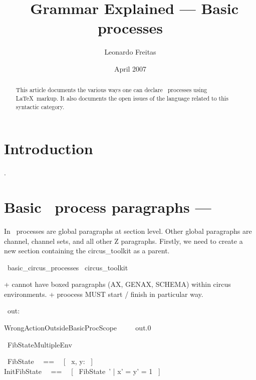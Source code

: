 \documentclass{article}
\begin{document}
\title{\Circus\ Grammar Explained --- Basic processes}
\author{Leonardo Freitas}
\date{April 2007}

\maketitle

\begin{abstract}
    \noindent This article documents the various ways one can declare \Circus\ processes using \LaTeX\ markup.
    It also documents the open issues of the language related to this syntactic category.
\end{abstract}

\section{Introduction}
.
\section{Basic \Circus\ process paragraphs --- }

In \Circus\ processes are global paragraphs at section level. Other
global paragraphs are channel, channel sets, and all other Z
paragraphs. Firstly, we need to create a new section containing the
\textsf{circus\_toolkit} as a parent.

\begin{zsection}
  \SECTION\ basic\_circus\_processes \parents\ circus\_toolkit
\end{zsection}

+ cannot have boxed paragraphs (AX, GENAX, SCHEMA) within circus environments.
+ proocess MUST start / finish in particular way.

\begin{circus}
    \circchannel\ out: \nat
\end{circus}

\begin{circusaction}
    WrongActionOutsideBasicProcScope ~~\circdef~~ out.0 \then \Skip
\end{circusaction}

\begin{circus}
    \circprocess\ FibStateMultipleEnv ~~\circdef~~ \circbegin
\end{circus}

\begin{circusaction}
    \circstate\ FibState ~~==~~ [~ x, y: \nat ~] \\
    InitFibState ~~==~~ [~ FibState~' | x' = y' = 1 ~]
\end{circusaction}
\end{document}
